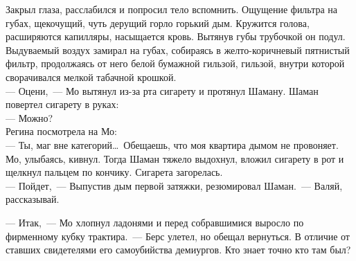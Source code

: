 Закрыл глаза, расслабился и попросил тело вспомнить. Ощущение фильтра на губах, 
щекочущий, чуть дерущий горло горький дым. Кружится голова, расширяются 
капилляры, насыщается кровь. Вытянув губы трубочкой он подул. Выдуваемый воздух 
замирал на губах, собираясь в желто-коричневый пятнистый фильтр, продолжаясь от 
него белой бумажной гильзой, гильзой, внутри которой сворачивался мелкой 
табачной крошкой.\\
--- Оцени,~--- Мо вытянул из-за рта сигарету и протянул Шаману. Шаман повертел 
сигарету в руках:\\
--- Можно?\\
Регина посмотрела на Мо:\\
--- Ты, маг вне категорий\ldots\ Обещаешь, что моя квартира дымом не провоняет.\\
Мо, улыбаясь, кивнул. Тогда Шаман тяжело выдохнул, вложил сигарету в рот и 
щелкнул пальцем по кончику. Сигарета загорелась.\\
--- Пойдет,~--- Выпустив дым первой затяжки, резюмировал Шаман.~--- Валяй, 
рассказывай.

\newpage

\noindent --- Итак,~--- Мо хлопнул ладонями и перед собравшимися выросло по фирменному 
кубку трактира.~--- Берс улетел, но обещал вернуться. В отличие от ставших 
свидетелями его самоубийства демиургов. Кто знает точно кто там был?

